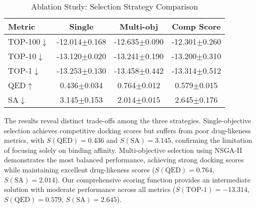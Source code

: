 \documentclass[lettersize,journal]{IEEEtran}
\begin{document}
\begin{table}[!t]
    \caption{Ablation Study: Selection Strategy Comparison}
    \label{tab:selection_ablation}
    \centering    
    \small
    \setlength{\tabcolsep}{4pt}
    
    \begin{tabular}{l c c c}
        \hline\hline
        Metric & Single & Multi-obj & Comp Score \\
        \hline
        TOP-100$\downarrow$ & -12.014$\pm$0.168 & -12.635$\pm$0.090 & -12.301$\pm$0.260 \\
        TOP-10$\downarrow$ & -13.120$\pm$0.020 & -13.241$\pm$0.190 & -13.200$\pm$0.310 \\
        TOP-1$\downarrow$ & -13.253$\pm$0.130 & -13.458$\pm$0.442 & -13.314$\pm$0.512 \\
        QED$\uparrow$ & 0.436$\pm$0.034 & 0.764$\pm$0.012 & 0.579$\pm$0.015 \\
        SA$\downarrow$ & 3.145$\pm$0.153 & 2.014$\pm$0.015 & 2.645$\pm$0.176 \\
        \hline\hline
    \end{tabular}
\end{table}

The results reveal distinct trade-offs among the three strategies. Single-objective selection achieves competitive docking scores but suffers from poor drug-likeness metrics, with $S(\text{QED}) = 0.436$ and $S(\text{SA}) = 3.145$, confirming the limitation of focusing solely on binding affinity. Multi-objective selection using NSGA-II demonstrates the most balanced performance, achieving strong docking scores while maintaining excellent drug-likeness scores ($S(\text{QED}) = 0.764$, $S(\text{SA}) = 2.014$). Our comprehensive scoring function provides an intermediate solution with moderate performance across all metrics ($S(\text{TOP-1}) = -13.314$, $S(\text{QED}) = 0.579$, $S(\text{SA}) = 2.645$).
\end{document}
